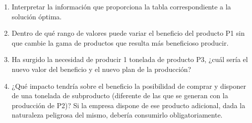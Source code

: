 \begin{enumerate}
    \item Interpretar la información que proporciona la tabla correspondiente a la solución óptima.

    \item Dentro de qué rango de valores puede variar el beneficio del producto P1 sin que cambie la gama de productos que resulta más beneficioso producir.

    \item Ha surgido la necesidad de producir 1 tonelada de producto P3, ¿cuál sería el nuevo valor del beneficio y el nuevo plan de la producción?
    
    \item ¿Qué impacto tendría sobre el beneficio la posibilidad de comprar y disponer de una tonelada de subproducto (diferente de las que se generan con la producción de P2)? Si la empresa dispone de ese producto adicional, dada la naturaleza peligrosa del mismo, debería consumirlo obligatoriamente.
    
\end{enumerate}






